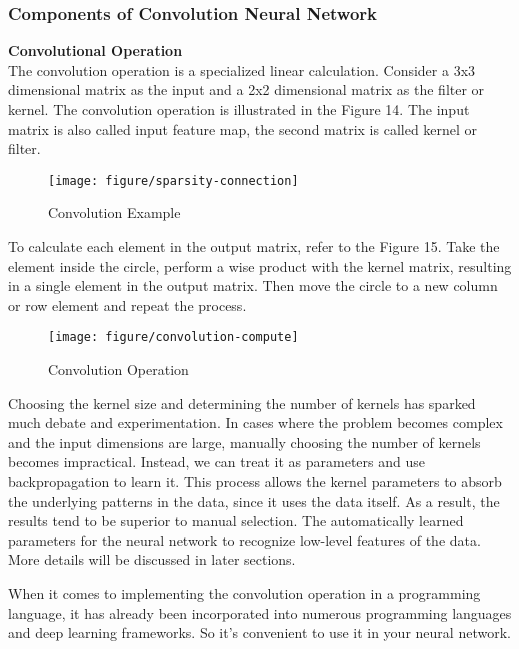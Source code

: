 \documentclass{article}
\begin{document}
\newpage
\subsubsection{Components of Convolution Neural Network}


\textbf{Convolutional Operation}\\
\noindent
The convolution operation is a specialized linear calculation. Consider a 3x3 dimensional matrix as the input and a 2x2 dimensional matrix as the filter or kernel. The convolution operation is illustrated in the Figure 14. The input matrix is also called input feature map, the second matrix is called kernel or filter.

\begin{figure}[htbp]
        \centering
        \texttt{[image: figure/sparsity-connection]}
        \caption{Convolution Example}
     \end{figure}

To calculate each element in the output matrix, refer to the Figure 15. Take the element inside the circle, perform a wise product with the kernel matrix, resulting in a single element in the output matrix. Then move the circle to a new column or row element and repeat the process.

    \begin{figure}[htbp]
        \centering
        \texttt{[image: figure/convolution-compute]}
        \caption{Convolution Operation}
     \end{figure}


Choosing the kernel size and determining the number of kernels has sparked much debate and experimentation. In cases where the problem becomes complex and the input dimensions are large, manually choosing the number of kernels becomes impractical. Instead, we can treat it as parameters and use backpropagation to learn it. This process allows the kernel parameters to absorb the underlying patterns in the data, since it uses the data itself. As a result, the results tend to be superior to manual selection. The automatically learned parameters for the neural network to recognize low-level features of the data. More details will be discussed in later sections.

When it comes to implementing the convolution operation in a programming language, it has already been incorporated into numerous programming languages and deep learning frameworks. So it's convenient to use it in your neural network.
\end{document}
